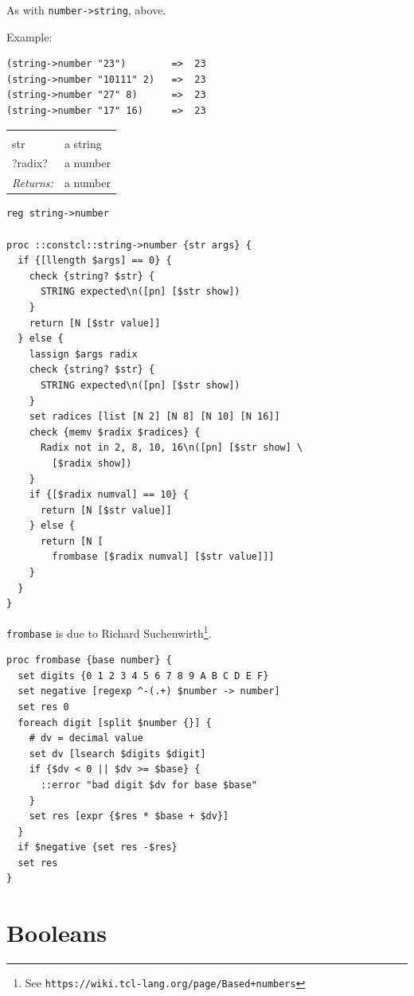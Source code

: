 \documentclass[twoside]{report}
\begin{document}
As with \texttt{number->string}, above.

Example:

\begin{verbatim}
(string->number "23")        =>  23
(string->number "10111" 2)   =>  23
(string->number "27" 8)      =>  23
(string->number "17" 16)     =>  23
\end{verbatim}

\noindent\begin{tabular}{ |p{1.9cm} p{8cm}| }
\hline
\rowcolor[HTML]{CCCCCC} \multicolumn{2}{|l|}{\bf string->number (public)} \\
str & a string \\
?radix? & a number \\
\textit{Returns:} & a number \\
\hline
\end{tabular}

\begin{lstlisting}
reg string->number

proc ::constcl::string->number {str args} {
  if {[llength $args] == 0} {
    check {string? $str} {
      STRING expected\n([pn] [$str show])
    }
    return [N [$str value]]
  } else {
    lassign $args radix
    check {string? $str} {
      STRING expected\n([pn] [$str show])
    }
    set radices [list [N 2] [N 8] [N 10] [N 16]]
    check {memv $radix $radices} {
      Radix not in 2, 8, 10, 16\n([pn] [$str show] \
        [$radix show])
    }
    if {[$radix numval] == 10} {
      return [N [$str value]]
    } else {
      return [N [
        frombase [$radix numval] [$str value]]]
    }
  }
}
\end{lstlisting}

\texttt{frombase} is due to Richard Suchenwirth\footnote{See \texttt{https://wiki.tcl-lang.org/page/Based+numbers}}.
\index{frombase procedure}

\begin{lstlisting}
proc frombase {base number} {
  set digits {0 1 2 3 4 5 6 7 8 9 A B C D E F}
  set negative [regexp ^-(.+) $number -> number]
  set res 0
  foreach digit [split $number {}] {
    # dv = decimal value
    set dv [lsearch $digits $digit]
    if {$dv < 0 || $dv >= $base} {
      ::error "bad digit $dv for base $base"
    }
    set res [expr {$res * $base + $dv}]
  }
  if $negative {set res -$res}
  set res
}
\end{lstlisting}

\section{Booleans}
\label{booleans}
\end{document}
